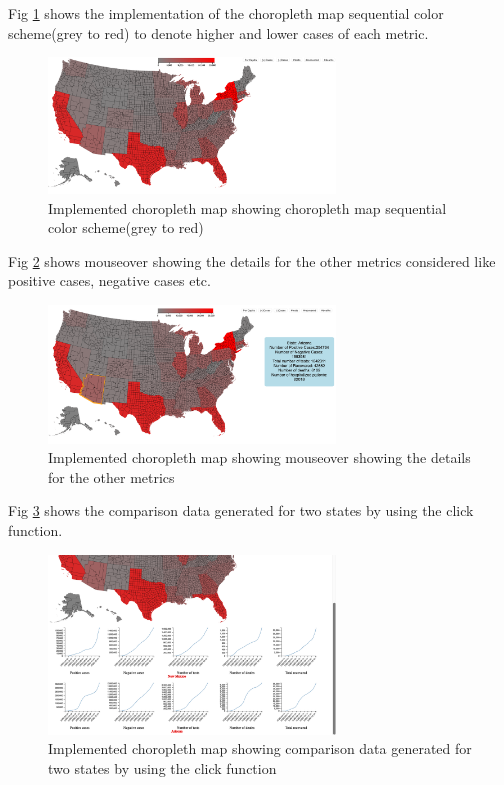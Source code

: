 \par Fig \ref{fig:Implementation-1} shows the implementation of the choropleth map sequential color scheme(grey to red) to denote higher and lower cases of each metric.
\begin{figure}[h]
 \centering 
 \includegraphics[width=3in]{figs/Implementation-1.png}
 \caption{Implemented choropleth map showing choropleth map sequential color scheme(grey to red)}
 \label{fig:Implementation-1}
\end{figure}

\par Fig \ref{fig:Implementation-2} shows mouseover showing the details for the other metrics considered like positive cases, negative cases etc.
\begin{figure}[h]
 \centering 
 \includegraphics[width=3in]{figs/Implementation-2.png}
 \caption{Implemented choropleth map showing mouseover showing the details for the other metrics }
 \label{fig:Implementation-2}
\end{figure}

\par Fig \ref{fig:Implementation-3} shows the comparison data generated for two states by using the click function.
\begin{figure}[h]
 \centering 
 \includegraphics[width=3in]{figs/Implementation-3.png}
 \caption{Implemented choropleth map showing comparison data generated for two states by using the click function}
 \label{fig:Implementation-3}
\end{figure}



